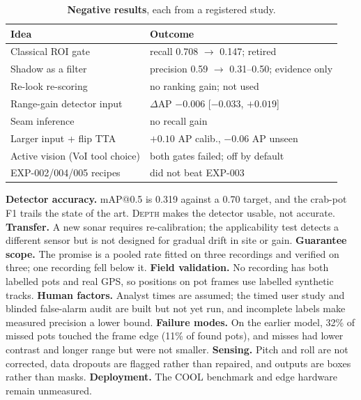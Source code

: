 \documentclass[10pt,twocolumn,letterpaper]{article}
\makeatletter
\renewcommand\section{\@startsection{section}{1}{\z@}{-2.0ex plus -0.5ex minus -.2ex}{1.0ex plus .2ex}{\large\bfseries}}
\newcommand{\depth}{\textsc{Depth}}
\makeatother
\begin{document}
\begin{table}[t]
\centering\small
\setlength{\tabcolsep}{3pt}
\begin{tabular}{@{}p{3.35cm}p{4.35cm}@{}}
\toprule
Idea & Outcome \\
\midrule
Classical ROI gate & recall 0.708 $\rightarrow$ 0.147; retired \\
Shadow as a filter & precision 0.59 $\rightarrow$ 0.31--0.50; evidence only \\
Re-look re-scoring & no ranking gain; not used \\
Range-gain detector input & $\Delta$AP $-0.006$ [$-0.033$, $+0.019$] \\
Seam inference & no recall gain \\
Larger input + flip TTA & $+0.10$ AP calib., $-0.06$ AP unseen \\
Active vision (VoI tool choice) & both gates failed; off by default \\
EXP-002/004/005 recipes & did not beat EXP-003 \\
\bottomrule
\end{tabular}
\caption{\textbf{Negative results}, each from a registered study.}
\label{tab:neg}
\end{table}

\section{Limitations}

\textbf{Detector accuracy.} mAP@0.5 is 0.319 against a 0.70 target, and the
crab-pot F1 trails the state of the art. \depth{} makes the detector usable, not
accurate. \textbf{Transfer.} A new sonar requires re-calibration; the
applicability test detects a different sensor but is not designed for gradual
drift in site or gain. \textbf{Guarantee scope.} The promise is a pooled rate
fitted on three recordings and verified on three; one recording fell below it.
\textbf{Field validation.} No recording has both labelled pots and real GPS, so
positions on pot frames use labelled synthetic tracks. \textbf{Human factors.}
Analyst times are assumed; the timed user study and blinded false-alarm audit are
built but not yet run, and incomplete labels make measured precision a lower
bound. \textbf{Failure modes.} On the earlier model, 32\% of missed pots touched
the frame edge (11\% of found pots), and misses had lower contrast and longer
range but were not smaller. \textbf{Sensing.} Pitch and roll are not corrected,
data dropouts are flagged rather than repaired, and outputs are boxes rather than
masks. \textbf{Deployment.} The COOL benchmark and edge hardware remain
unmeasured.
\end{document}
